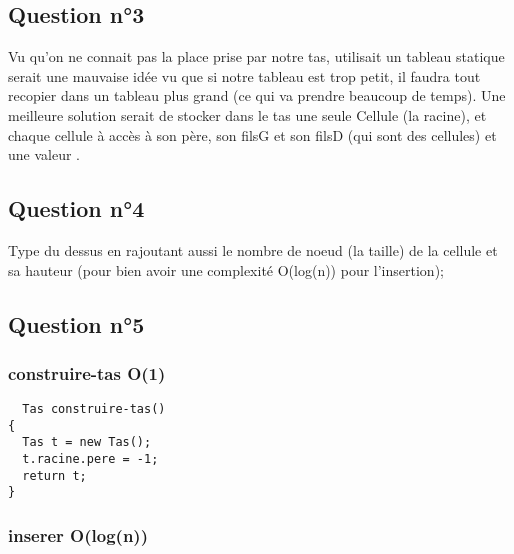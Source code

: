 \documentclass[11pt]{article}
\begin{document}
\subsection{Question n°3}
\label{sec:org8935bda}

Vu qu'on ne connait pas la place prise par notre tas, utilisait un tableau statique serait une mauvaise idée vu que si notre tableau est trop petit, il faudra tout recopier dans un tableau plus grand (ce qui va prendre beaucoup de temps). Une meilleure solution serait de stocker dans le tas une seule Cellule (la racine), et chaque cellule à accès à son père, son filsG et son filsD (qui sont des cellules) et une valeur .

\subsection{Question n°4}
\label{sec:org75afc45}
Type du dessus en rajoutant aussi le nombre de noeud (la taille) de la cellule et sa hauteur (pour bien avoir une complexité O(log(n)) pour l'insertion);

\subsection{Question n°5}
\label{sec:orge1f27dd}
\subsubsection{construire-tas O(1)}
\label{sec:orgddba57a}

\begin{lstlisting}
  Tas construire-tas()
{
  Tas t = new Tas();
  t.racine.pere = -1;
  return t;
}
\end{lstlisting}

\subsubsection{inserer O(log(n))}
\label{sec:org3d8f4ed}
\end{document}
